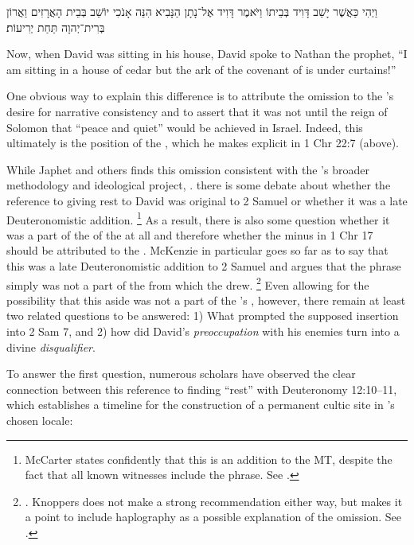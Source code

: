 \begin{hebrewtext}
    וַיְהִי כַּאֲשֶׁר יָשַׁב דָּוִיד בְּבֵיתוֹ וַיֹּאמֶר דָּוִיד אֶל־נָתָן הַנָּבִיא הִנֵּה אָנֹכִי יוֹשֵׁב בְּבֵית הָאֲרָזִים וַאֲרוֹן בְּרִית־יְהוָה תַּחַת יְרִיעוֹת׃
\end{hebrewtext}
\begin{translation}
    Now, when David was sitting in his house, David spoke to Nathan the prophet, ``I am sitting in a house of cedar but the ark of the covenant of \yahweh is under curtains!'' 
\end{translation}
One obvious way to explain this difference is to attribute the omission to the \chronicler's desire for narrative consistency and to assert that it was not until the reign of Solomon that ``peace and quiet'' would be achieved in Israel. Indeed, this ultimately is the position of the \chronicler, which he makes explicit in 1 Chr 22:7 (above). 

While Japhet and others finds this omission consistent with the \chronicler's broader methodology and ideological project,%
    \autocite[328]{japhet1993}.
there is some debate about whether the reference to \yahweh giving rest to David was original to 2 Samuel or whether it was a late Deuteronomistic addition.%
    \footnote{McCarter states confidently that this is an addition to the MT, despite the fact that all known witnesses include the phrase. See \cite[191]{mccarter1984}.}
As a result, there is also some question whether it was a part of the \vorlage of the \chronicler at all and therefore whether the minus in 1 Chr 17 should be attributed to the \chronicler. McKenzie in particular goes so far as to say that this was a late Deuteronomistic addition to 2 Samuel and argues that the phrase simply was not a part of the \vorlage from which the \chronicler drew.%
    \footnote{\cite[63]{mckenzie1985}. Knoppers does not make a strong recommendation either way, but makes it a point to include haplography as a possible explanation of the omission. See \cite[666]{knoppers2007}.}
Even allowing for the possibility that this aside was not a part of the \chronicler's \vorlage, however, there remain at least two related questions to be answered: 1) What prompted the supposed insertion into 2 Sam 7, and 2) how did David's \emph{preoccupation} with his enemies turn into a divine \emph{disqualifier}.

To answer the first question, numerous scholars have observed the clear connection between this reference to finding ``rest'' with Deuteronomy 12:10--11, which establishes a timeline for the construction of a permanent cultic site in \yahweh's chosen locale:

